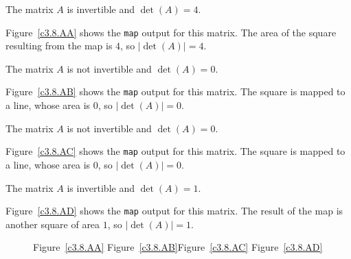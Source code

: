 \documentclass{ximera}
\begin{document}
 \ans The matrix $A$ is invertible and $\det(A) = 4$.

\soln Figure~\ref{c3.8.AA} shows the {\tt map} output for this matrix.
The area of the square resulting from the map is $4$, so $|\det(A)| = 4$.

 \ans The matrix $A$ is not invertible and $\det(A) = 0$.

\soln Figure~\ref{c3.8.AB} shows the {\tt map} output for this matrix.
The square is mapped to a line, whose area is $0$, so $|\det(A)| = 0$.

 \ans The matrix $A$ is not invertible and $\det(A) = 0$.

\soln Figure~\ref{c3.8.AC} shows the {\tt map} output for this matrix.
The square is mapped to a line, whose area is $0$, so $|\det(A)| = 0$.

\newpage
{} \ans The matrix $A$ is invertible and $\det(A) = 1$.

\soln Figure~\ref{c3.8.AD} shows the {\tt map} output for this matrix.
The result of the map is another square of area $1$, so $|\det(A)| = 1$.

\begin{figure}[htb]
                       \centerline{%
                       }
        \centerline{Figure~\ref{c3.8.AA}\hspace{0.8in}
        Figure~\ref{c3.8.AB}\hspace{0.8in}Figure~\ref{c3.8.AC}
        \hspace{0.8in}Figure~\ref{c3.8.AD}}
\end{figure}
\end{document}
